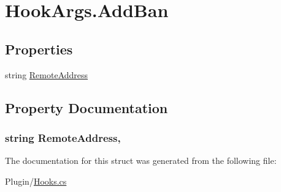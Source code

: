 \hypertarget{structOTA_1_1Plugin_1_1HookArgs_1_1AddBan}{}\section{Hook\+Args.\+Add\+Ban}
\label{structOTA_1_1Plugin_1_1HookArgs_1_1AddBan}
\subsection*{Properties}
\begin{DoxyCompactItemize}
\item 
string \hyperlink{structOTA_1_1Plugin_1_1HookArgs_1_1AddBan_a5b3fbccddb2ac7b5856c0cb3a6a6e60c}{Remote\+Address}
\end{DoxyCompactItemize}


\subsection{Property Documentation}
\hypertarget{structOTA_1_1Plugin_1_1HookArgs_1_1AddBan_a5b3fbccddb2ac7b5856c0cb3a6a6e60c}{}
\subsubsection[{Remote\+Address}]{\setlength{\rightskip}{0pt plus 5cm}string Remote\+Address\hspace{0.3cm}{\ttfamily [get]}, {\ttfamily [set]}}\label{structOTA_1_1Plugin_1_1HookArgs_1_1AddBan_a5b3fbccddb2ac7b5856c0cb3a6a6e60c}


The documentation for this struct was generated from the following file\+:\begin{DoxyCompactItemize}
\item 
Plugin/\hyperlink{Hooks_8cs}{Hooks.\+cs}\end{DoxyCompactItemize}
